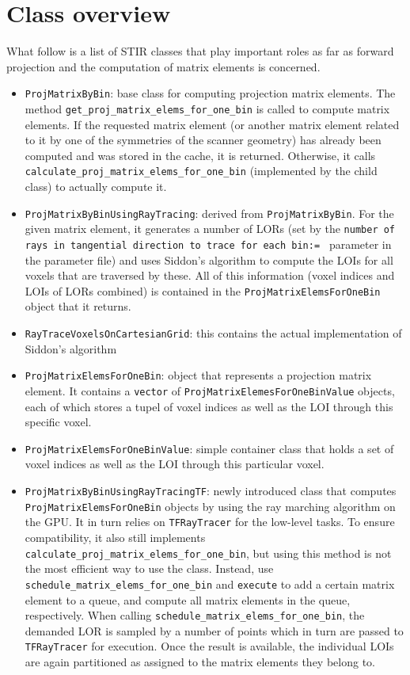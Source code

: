 \documentclass[a4paper, 11pt]{article}
\begin{document}
  \section{Class overview}
  What follow is a list of STIR classes that play important roles as far as forward projection and the computation of matrix elements is concerned. 
  \begin{itemize}
    \item \texttt{ProjMatrixByBin}: base class for computing projection matrix elements. The method \texttt{get\_proj\-\_matrix\_elems\_for\_one\_bin} is called to compute matrix elements. If the requested matrix element (or another matrix element related to it by one of the symmetries of the scanner geometry) has already been computed and was stored in the cache, it is returned. Otherwise, it calls \texttt{calculate\_proj\_matrix\_elems\_for\_one\_bin} (implemented by the child class) to actually compute it.
    \item \texttt{ProjMatrixByBinUsingRayTracing}: derived from \texttt{ProjMatrixByBin}. For the given matrix element, it generates a number of LORs (set by the \texttt{number of rays in tangential direction to trace for each bin:= } parameter in the parameter file) and uses Siddon's algorithm to compute the LOIs for all voxels that are traversed by these. All of this information (voxel indices and LOIs of LORs combined) is contained in the \texttt{ProjMatrixElemsForOneBin} object that it returns.
    \item \texttt{RayTraceVoxelsOnCartesianGrid}: this contains the actual implementation of Siddon's algorithm
    \item \texttt{ProjMatrixElemsForOneBin}: object that represents a projection matrix element. It contains a \texttt{vector} of \texttt{ProjMatrixElemesForOneBinValue} objects, each of which stores a tupel of voxel indices as well as the LOI through this specific voxel.
    \item \texttt{ProjMatrixElemsForOneBinValue}: simple container class that holds a set of voxel indices as well as the LOI through this particular voxel.
    \item \texttt{ProjMatrixByBinUsingRayTracingTF}: newly introduced class that computes \texttt{ProjMatrixElems\-ForOneBin} objects by using the ray marching algorithm on the GPU. It in turn relies on \texttt{TFRayTracer} for the low-level tasks. To ensure compatibility, it also still implements \texttt{calculate\-\_proj\_matrix\_elems\_for\_one\_bin}, but using this method is not the most efficient way to use the class. Instead, use \texttt{schedule\_matrix\_elems\_for\_one\_bin} and \texttt{execute} to add a certain matrix element to a queue, and compute all matrix elements in the queue, respectively. When calling \texttt{schedule\_matrix\_elems\_for\_one\_bin}, the demanded LOR is sampled by a number of points which in turn are passed to \texttt{TFRayTracer} for execution. Once the result is available, the individual LOIs are again partitioned as assigned to the matrix elements they belong to.

\end{itemize}
\end{document}
